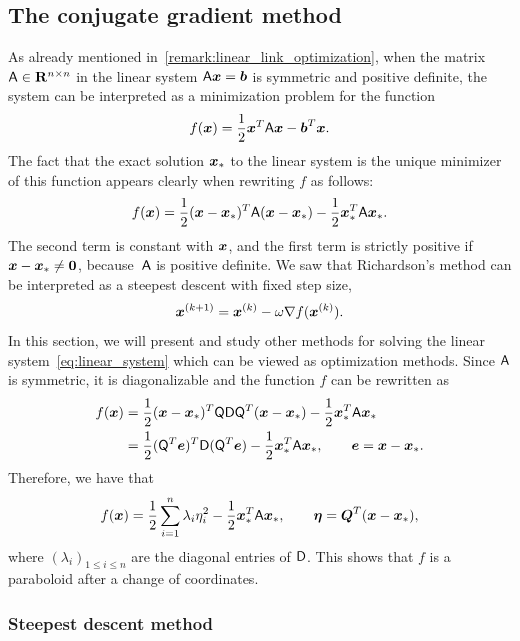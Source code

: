 \subsection{The conjugate gradient method}%
\label{sub:the_conjugate_gradient_method}

As already mentioned in~\cref{remark:linear_link_optimization},
when the matrix $\mathsf A \in \mathbf R^{n \times n}$ in the linear system $\mathsf A \mathbf{\boldsymbol{x}} = \mathbf{\boldsymbol{b}}$ is symmetric and positive definite,
the system can be interpreted as a minimization problem for the function
\begin{equation}
    \label{eq:function_optimization}
    f(\mathbf{\boldsymbol{x}}) = \frac{1}{2} \mathbf{\boldsymbol{x}}^T \mathsf A \mathbf{\boldsymbol{x}} - \mathbf{\boldsymbol{b}}^T \mathbf{\boldsymbol{x}}.
\end{equation}
The fact that
the exact solution $\mathbf{\boldsymbol{x}}_*$ to the linear system is the unique minimizer of this function appears clearly
when rewriting $f$ as follows:
\[
    f(\mathbf{\boldsymbol{x}})
    = \frac{1}{2} (\mathbf{\boldsymbol{x}} - \mathbf{\boldsymbol{x}}_*)^T \mathsf A (\mathbf{\boldsymbol{x}} - \mathbf{\boldsymbol{x}}_*)  - \frac{1}{2} \mathbf{\boldsymbol{x}}_*^T \mathsf A \mathbf{\boldsymbol{x}}_{*}.
\]
The second term is constant with $\mathbf{\boldsymbol{x}}$,
and the first term is strictly positive if $\mathbf{\boldsymbol{x}} - \mathbf{\boldsymbol{x}}_* \neq \mathbf{\boldsymbol{0}}$,
because~$\mathsf A$ is positive definite.
We saw that Richardson's method can be interpreted as a steepest descent with fixed step size,
\[
    \mathbf{\boldsymbol{x}}^{(k+1)} = \mathbf{\boldsymbol{x}}^{(k)} - \omega \nabla f(\mathbf{\boldsymbol{x}}^{(k)}).
\]
In this section,
we will present and study other methods
for solving the linear system~\eqref{eq:linear_system}
which can be viewed as optimization methods.
Since $\mathsf A$ is symmetric,
it is diagonalizable and the function $f$ can be rewritten as
\begin{align*}
    f(\mathbf{\boldsymbol{x}})
    &= \frac{1}{2} (\mathbf{\boldsymbol{x}} - \mathbf{\boldsymbol{x}}_*)^T \mathsf Q \mathsf D \mathsf Q^T (\mathbf{\boldsymbol{x}} - \mathbf{\boldsymbol{x}}_*)  - \frac{1}{2} \mathbf{\boldsymbol{x}}_*^T \mathsf A \mathbf{\boldsymbol{x}}_{*} \\
    &= \frac{1}{2} (\mathsf Q^T \mathbf{\boldsymbol{e}})^T \mathsf D (\mathsf Q^T \mathbf{\boldsymbol{e}})  - \frac{1}{2} \mathbf{\boldsymbol{x}}_*^T \mathsf A \mathbf{\boldsymbol{x}}_{*}, \qquad  \mathbf{\boldsymbol{e}} = \mathbf{\boldsymbol{x}} - \mathbf{\boldsymbol{x}}_*.
\end{align*}
Therefore, we have that
\begin{align*}
    f(\mathbf{\boldsymbol{x}})= \frac{1}{2} \sum_{i=1}^{n} \lambda_i \eta_i^2 - \frac{1}{2} \mathbf{\boldsymbol{x}}_*^T \mathsf A \mathbf{\boldsymbol{x}}_{*}, \qquad  \mathbf{\boldsymbol{\eta}} = \mathbf{\boldsymbol{Q}}^T (\mathbf{\boldsymbol{x}} - \mathbf{\boldsymbol{x}}_*),
\end{align*}
where $(\lambda_i)_{1 \leq i \leq n}$ are the diagonal entries of $\mathsf D$.
This shows that $f$ is a paraboloid
after a change of coordinates.

\subsubsection{Steepest descent method}%
\label{ssub:steepest_descent_method}

